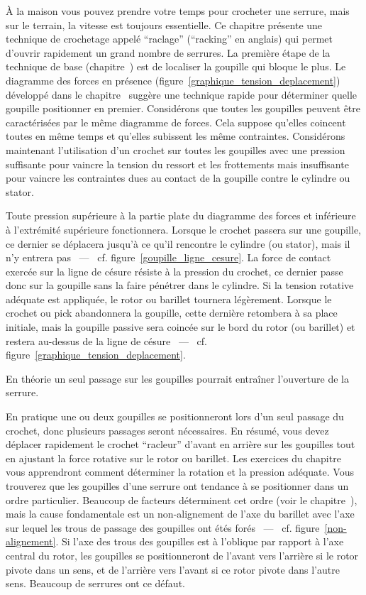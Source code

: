 \documentclass[a4paper,french,11pt,twoside]{report}
\begin{document}
À la maison vous pouvez prendre votre temps pour crocheter une serrure, mais sur le terrain, la vitesse est toujours essentielle. Ce chapitre présente une technique de crochetage appelé \enquote{raclage} (\enquote{racking} en anglais) qui permet d'ouvrir rapidement un grand nombre de serrures. La première étape de la technique de base (chapitre~) est de localiser la goupille qui bloque le plus. Le diagramme des forces en présence (figure~\vref{graphique_tension_deplacement}) développé dans le chapitre~ suggère une technique rapide pour déterminer quelle goupille positionner en premier. Considérons que toutes les goupilles peuvent être caractérisées par le même diagramme de forces. Cela suppose qu'elles coincent toutes en même temps et qu'elles subissent les même contraintes. Considérons maintenant l'utilisation d'un crochet sur toutes les goupilles avec une pression suffisante pour vaincre la tension du ressort et les frottements mais insuffisante pour vaincre les contraintes dues au contact de la goupille contre le cylindre ou stator.

Toute pression supérieure à la partie plate du diagramme des forces et inférieure à l'extrémité supérieure fonctionnera. Lorsque le crochet passera sur une goupille, ce dernier se déplacera jusqu'à ce qu'il rencontre le cylindre (ou stator), mais il n'y entrera pas ~---~ cf. figure~\vref{goupille_ligne_cesure}. La force de contact exercée sur la ligne de césure résiste à la pression du crochet, ce dernier passe donc sur la goupille sans la faire pénétrer dans le cylindre. Si la tension rotative adéquate est appliquée, le rotor ou barillet tournera légèrement. Lorsque le crochet ou pick abandonnera la goupille, cette dernière retombera à sa place initiale, mais la goupille passive sera coincée sur le bord du rotor (ou barillet) et restera au-dessus de la ligne de césure ~---~ cf. figure~\vref{graphique_tension_deplacement}.

En théorie un seul passage sur les goupilles pourrait entraîner l'ouverture de la serrure.

En pratique une ou deux goupilles se positionneront lors d'un seul passage du crochet, donc plusieurs passages seront nécessaires. En résumé, vous devez déplacer rapidement le crochet \enquote{racleur} d'avant en arrière sur les goupilles tout en ajustant la force rotative sur le rotor ou barillet. Les exercices du chapitre~ vous apprendront comment déterminer la rotation et la pression adéquate. Vous trouverez que les goupilles d'une serrure ont tendance à se positionner dans un ordre particulier. Beaucoup de facteurs déterminent cet ordre (voir le chapitre~), mais la cause fondamentale est un non-alignement de l'axe du barillet avec l'axe sur lequel les trous de passage des goupilles ont étés forés ~---~ cf. figure~\vref{non-alignement}. Si l'axe des trous des goupilles est à l'oblique par rapport à l'axe central du rotor, les goupilles se positionneront de l'avant vers l'arrière si le rotor pivote dans un sens, et de l'arrière vers l'avant si ce rotor pivote dans l'autre sens. Beaucoup de serrures ont ce défaut.
\end{document}
